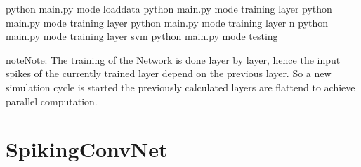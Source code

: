\documentclass[letterpaper,10pt,english]{sphinxmanual}
\begin{document}
\begin{sphinxVerbatim}[commandchars=\\\{\}]
   
 
 
 
\end{sphinxVerbatim}

\begin{sphinxVerbatim}[commandchars=\\\{\}]
python main.py \PYGZhy{}\PYGZhy{}mode loaddata
python main.py \PYGZhy{}\PYGZhy{}mode training \PYGZhy{}\PYGZhy{}layer 
python main.py \PYGZhy{}\PYGZhy{}mode training \PYGZhy{}\PYGZhy{}layer 
python main.py \PYGZhy{}\PYGZhy{}mode training \PYGZhy{}\PYGZhy{}layer n
python main.py \PYGZhy{}\PYGZhy{}mode training \PYGZhy{}\PYGZhy{}layer svm
python main.py \PYGZhy{}\PYGZhy{}mode testing
\end{sphinxVerbatim}

\begin{sphinxadmonition}{note}{Note:}
The training of the Network is done layer by layer, hence the input spikes of the currently trained layer depend on the previous layer.
So a new simulation cycle is started the previously calculated layers are flattend to achieve parallel computation.
\end{sphinxadmonition}


\chapter{SpikingConvNet}
\label{\detokenize{modules:spikingconvnet}}\label{\detokenize{modules::doc}}
\end{document}
